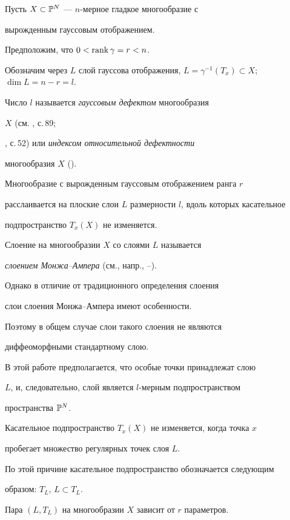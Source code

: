 Пусть $X \subset \Bbb P^N$ --- $n$-мерное гладкое многообразие с


вырожденным гауссовым отображением.


Предположим, что  $0 < \operatorname{rank} \gamma = r < n$.


Обозначим через $L$ слой гауссова отображения, $L =


\gamma^{-1} (T_x) \subset X$; $\dim L = n - r = l$.


Число $l$ называется {\it гауссовым дефектом} многообразия


$X$ (см. \cite{FP01}, с.\,89;


\cite{L99}, с.\,52) или {\it индексом относительной дефектности}


многообразия  $X$ (\cite{CK52}).





Многообразие с вырожденным гауссовым отображением ранга $r$


расслаивается на плоские слои $L$ размерности $l$, вдоль которых касательное


подпространство $T_x (X)$ не изменяется.


Слоение на многообразии $X$ со слоями $L$ называется


{\em слоением Монжа--Ампера} (см., напр., \cite{D89}--\cite{I99b}).





Однако в отличие от традиционного определения слоения


слои слоения Монжа--Ампера имеют особенности.


Поэтому в общем случае слои такого слоения не являются


диффеоморфными стандартному слою.


В этой работе предполагается, что особые точки принадлежат слою


$L$, и, следовательно, слой является $l$-мерным подпространством


пространства ${\Bbb P}^N$.





Касательное подпространство $T_x (X)$ не изменяется, когда точка $x$


пробегает множество регулярных точек слоя  $L$.


По этой причине касательное подпространство обозначается следующим


образом: $T_L$,  $L \subset T_L$.


Пара $(L, T_L)$ на многообразии $X$ зависит от $r$ параметров.





